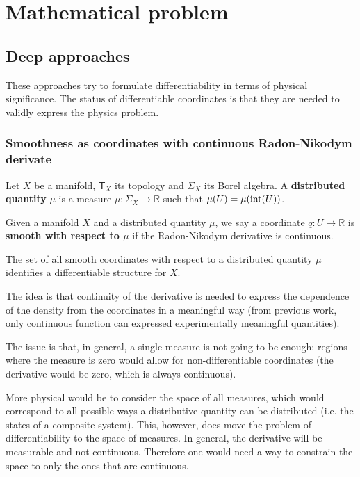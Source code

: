 \documentclass[10pt, onecolumn, longbibliography, nofootinbib]{revtex4-2}
\begin{document}
\section{Mathematical problem}

\subsection{Deep approaches}

These approaches try to formulate differentiability in terms of physical significance. The status of differentiable coordinates is that they are needed to validly express the physics problem.

\subsubsection{Smoothness as coordinates with continuous Radon-Nikodym derivate}

\begin{defn}
	Let $X$ be a manifold, $\textsf{T}_X$ its topology and $\Sigma_X$ its Borel algebra. A \textbf{distributed quantity} $\mu$ is a measure $\mu : \Sigma_X \to \mathbb{R}$ such that $\mu(U) = \mu(\operatorname{int}(U))$. 
\end{defn}

\begin{defn}
	Given a manifold $X$ and a distributed quantity $\mu$, we say a coordinate $q : U \to \mathbb{R}$ is \textbf{smooth with respect to $\mu$} if the Radon-Nikodym derivative is continuous.
\end{defn}

\begin{desid}
	The set of all smooth coordinates with respect to a distributed quantity $\mu$ identifies a differentiable structure for $X$.
\end{desid}

The idea is that continuity of the derivative is needed to express the dependence of the density from the coordinates in a meaningful way (from previous work, only continuous function can expressed experimentally meaningful quantities).

The issue is that, in general, a single measure is not going to be enough: regions where the measure is zero would allow for non-differentiable coordinates (the derivative would be zero, which is always continuous).

More physical would be to consider the space of all measures, which would correspond to all possible ways a distributive quantity can be distributed (i.e. the states of a composite system). This, however, does move the problem of differentiability to the space of measures. In general, the derivative will be measurable and not continuous. Therefore one would need a way to constrain the space to only the ones that are continuous.
\end{document}
